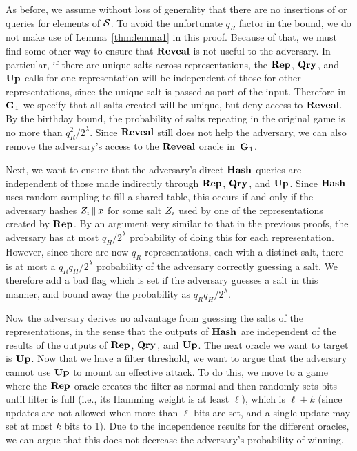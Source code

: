 As before, we assume without loss of generality that there are no insertions of
or queries for elements of $\mathcal{S}$.
%
To avoid the unfortunate $q_R$ factor in the bound, we do not make use of
Lemma~\ref{thm:lemma1} in this proof. Because of that, we must find some other
way to ensure that $\mathbf{Reveal}$ is not useful to the adversary. In particular, if
there are unique salts across representations, the $\textup{\textbf{Rep}}\hspace{0.5pt}$, $\textup{\textbf{Qry}}\hspace{0.5pt}$, and $\textup{\textbf{Up}}\hspace{0.5pt}$
calls for one representation will be independent of those for other
representations, since the unique salt is passed as part of the input. Therefore
in~$\textup{\textbf{G}}\hspace{0.5pt}_1$ we specify that all salts created will be unique, but deny access
to $\mathbf{Reveal}$. By the birthday bound, the probability of salts repeating
in the original game is no more than $q_R^2/2^\lambda$. Since $\mathbf{Reveal}$ still does
not help the adversary, we can also remove the adversary's access to the $\mathbf{Reveal}$
oracle in~$\textup{\textbf{G}}\hspace{0.5pt}_1$.

Next, we want to ensure that the adversary's direct $\textup{\textbf{Hash}}\hspace{0.5pt}$ queries are
independent of those made indirectly through $\textup{\textbf{Rep}}\hspace{0.5pt}$, $\textup{\textbf{Qry}}\hspace{0.5pt}$, and $\textup{\textbf{Up}}\hspace{0.5pt}$.
Since $\textup{\textbf{Hash}}\hspace{0.5pt}$ uses random sampling to fill a shared table, this
occurs if and only if the adversary hashes $Z_i \, \| \, x$
for some salt $Z_i$ used by one of the representations created by $\textup{\textbf{Rep}}\hspace{0.5pt}$.
By an argument very similar to that in the previous proofs, the adversary has at
most $q_H/2^\lambda$ probability of doing this for
each representation. However, since there are now $q_R$
representations, each with a distinct salt, there is at most a
$q_Rq_H/2^\lambda$ probability of the adversary correctly guessing a salt.
We therefore add a bad flag which is set if the adversary guesses a salt in this
manner, and bound away the probability as $q_Rq_H/2^\lambda$.

Now the adversary derives no advantage from guessing the salts of the
representations, in the sense that the outputs of $\textup{\textbf{Hash}}\hspace{0.5pt}$ are independent of the results
of the outputs of $\textup{\textbf{Rep}}\hspace{0.5pt}$, $\textup{\textbf{Qry}}\hspace{0.5pt}$, and $\textup{\textbf{Up}}\hspace{0.5pt}$. The next oracle we want to target
is $\textup{\textbf{Up}}\hspace{0.5pt}$. Now that we have a filter threshold, we want to argue that the
adversary cannot use $\textup{\textbf{Up}}\hspace{0.5pt}$ to mount an effective attack.
%
To do this, we move to a game where the $\textup{\textbf{Rep}}\hspace{0.5pt}$ oracle creates the filter as normal and then
randomly sets bits until filter is full (i.e., its Hamming weight is at least
$\ell$), which is $\ell+k$ (since
updates are not allowed when more than $\ell$ bits are set, and a single update
may set at most $k$ bits to 1). Due to the independence results for the different oracles,
we can argue that this does not decrease the adversary's probability of winning. %

